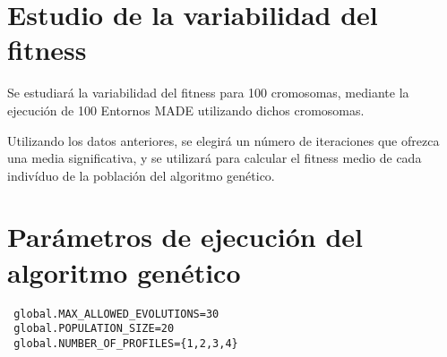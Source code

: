 \section{Estudio de la variabilidad del fitness}

Se estudiará la variabilidad del fitness para 100 cromosomas, mediante la
ejecución de 100 Entornos MADE utilizando dichos cromosomas.

Utilizando los datos anteriores, se elegirá un número de iteraciones que
ofrezca una media significativa, y se utilizará para calcular el fitness medio
de cada indivíduo de la población del algoritmo genético.


\section{Parámetros de ejecución del algoritmo genético}

\begin{verbatim}
 global.MAX_ALLOWED_EVOLUTIONS=30
 global.POPULATION_SIZE=20
 global.NUMBER_OF_PROFILES={1,2,3,4}
\end{verbatim}
